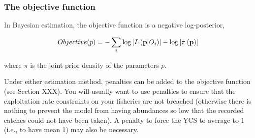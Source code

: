 \subsubsection{The objective function}

In Bayesian estimation, the objective function is a negative log-posterior,

\[
Objective(p)= - \sum\limits_i {\log \left[ {L\left( {{\bf{p}}|O_i } \right)} \right]}  - \log \left[ {\pi \left( {\bf{p}} \right)} \right]
\]

where $\pi$ is the joint prior density of the parameters $p$.

Under either estimation method, penalties can be added to the objective function (see Section XXX). You will usually want to use penalties to ensure that the exploitation rate constraints on your fisheries are not breached (otherwise there is nothing to prevent the model from having abundances so low that the recorded catches could not have been taken). A penalty to force the YCS to average to 1 (i.e., to have mean 1) may also be necessary.
